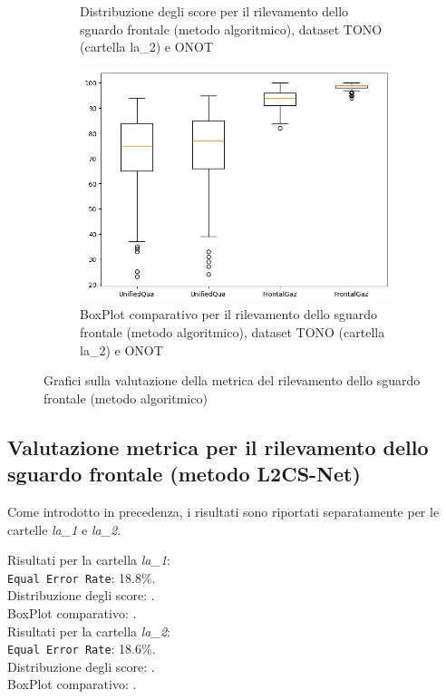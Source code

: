 \documentclass[12pt,a4paper,openright,twoside]{book}
\begin{document}
\begin{figure}[htbp]
\begin{subfigure}{0.49\textwidth}
        \caption{Distribuzione degli score per il rilevamento dello sguardo frontale (metodo algoritmico), dataset TONO (cartella la\_2) e ONOT}
        \label{fig:score_distribution_tono_onot_l2_frontal_gaze_algo}
    \end{subfigure}
    \hfill
    \begin{subfigure}{0.49\textwidth}
        \centering
        \includegraphics[width=.7\linewidth]{figures/box-plot-tono-onot-l2-frontal-gaze-algo.png}
        \caption{BoxPlot comparativo per il rilevamento dello sguardo frontale (metodo algoritmico), dataset TONO (cartella la\_2) e ONOT}
        \label{fig:box_plot_tono_onot_l2_frontal_gaze_algo}
    \end{subfigure}

    \caption{Grafici sulla valutazione della metrica del rilevamento dello sguardo frontale (metodo algoritmico)}
\end{figure}

\subsection{Valutazione metrica per il rilevamento dello sguardo frontale (metodo L2CS-Net)}
Come introdotto in precedenza, i risultati sono riportati separatamente per le cartelle \textit{la\_1} e \textit{la\_2}.

\noindent Risultati per la cartella \textit{la\_1}: \\
\texttt{Equal Error Rate}: 18.8\%. \\
Distribuzione degli score: . \\
BoxPlot comparativo: . \\

\noindent Risultati per la cartella \textit{la\_2}: \\
\texttt{Equal Error Rate}: 18.6\%. \\
Distribuzione degli score: . \\
BoxPlot comparativo: . 
\end{document}
